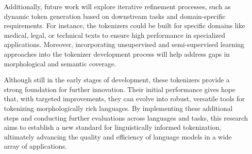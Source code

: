 Additionally, future work will explore iterative refinement processes, such as dynamic token generation based on downstream tasks and domain-specific requirements. For instance, the tokenizers could be built for specific domains like medical, legal, or technical texts to ensure high performance in specialized applications. Moreover, incorporating unsupervised and semi-supervised learning approaches into the tokenizer development process will help address gaps in morphological and semantic coverage.

Although still in the early stages of development, these tokenizers provide a strong foundation for further innovation. Their initial performance gives hope that, with targeted improvements, they can evolve into robust, versatile tools for tokenizing morphologically rich languages. By implementing these additional steps and conducting further evaluations across languages and tasks, this research aims to establish a new standard for linguistically informed tokenization, ultimately advancing the quality and efficiency of language models in a wide array of applications.